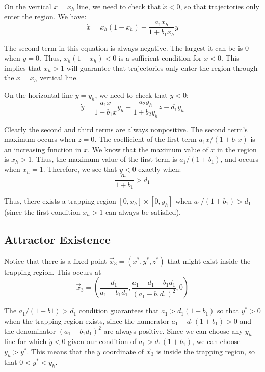 \documentclass[12pt,journal,compsoc,twoside]{IEEEtran}
\begin{document}
On the vertical $x = x_h$ line, we need to check that $\dot{x} < 0$, so that trajectories only enter the region. We have:
\begin{equation}
\dot{x} = x_h(1 - x_h) - \frac{a_1 x_h}{1 + b_1 x_h} y
\end{equation}

The second term in this equation is always negative. The largest it can be is $0$ when $y = 0$. Thus, $x_h ( 1 - x_h) < 0$ is a sufficient condition for $\dot{x} < 0$. This implies that $x_h > 1$ will guarantee that trajectories only enter the region through the $x = x_h$ vertical line. 

On the horizontal line $y = y_h$, we need to check that $\dot{y} < 0$:
\begin{equation}
\dot{y} = \frac{a_1 x}{1 + b_1 x} y_h - \frac{a_2 y_h}{1 + b_2 y_h} z - d_1 y_h
\end{equation}

Clearly the second and third terms are always nonpositive. The second term's maximum occurs when $z = 0$. The coefficient of the first term $a_1 x / (1 + b_1 x)$ is an increasing function in $x$. We know that the maximum value of $x$ in the region is $x_h > 1$. Thus, the maximum value of the first term is $a_1 / (1 + b_1)$, and occurs when $x_h = 1$. Therefore, we see that $\dot{y} < 0$ exactly when:
\begin{equation}
\frac{a_1}{1 + b_1} > d_1
\end{equation}

Thus, there exists a trapping region $[0,x_h] \times [0, y_h]$ when $a_1 / (1 + b_1) > d_1$ (since the first condition $x_h > 1$ can always be satisfied). 

\subsection{Attractor Existence}
\label{sec:attractorexist}

Notice that there is a fixed point $\vec{x}_3 = (x^{*},y^{*},z^{*})$ that might exist inside the trapping region. This occurs at 
\begin{equation}
\vec{x}_3 = \left( \frac{d_1}{a_1 - b_1 d_1}, \frac{a_1 - d_1 - b_1 d_1}{(a_1 - b_1 d_1)^2}, 0 \right)
\end{equation}

The $a_1 / (1 + b1) > d_1$ condition guarantees that $a_1 > d_1 (1 + b_1)$ so that $y^{*} > 0$ when the trapping region exists, since the numerator $a_1 - d_1(1 + b_1) >0$ and the denominator $(a_1 - b_1 d_1)^2$ are always positive. Since we can choose any $y_h$ line for which $\dot{y} < 0$ given our condition of $a_1 > d_1 ( 1 + b_1)$, we can choose $y_h > y^{*}$. This means that the $y$ coordinate of $\vec{x}_3$ is inside the trapping region, so that $0 < y^{*} < y_h$.
\end{document}
